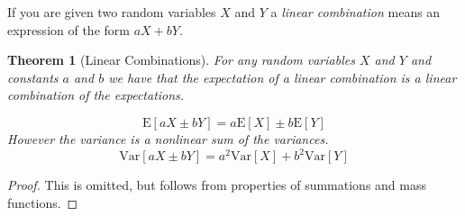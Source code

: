 \documentclass[
]{book}
\newtheorem{theorem}{Theorem}[chapter]
\theoremstyle{definition}
\theoremstyle{definition}
\theoremstyle{definition}
\theoremstyle{definition}
\theoremstyle{remark}
\begin{document}
If you are given two random variables \(X\) and \(Y\) a \emph{linear combination} means an expression of the form \(aX+bY\).

\begin{theorem}[Linear Combinations]
For any random variables \(X\) and \(Y\) and constants \(a\) and \(b\) we have that the expectation of a linear combination is a linear combination of the expectations.

\[\text{E}[aX\pm bY] = a\text{E}[X]\pm b\text{E}[Y]\]
However the variance is a nonlinear sum of the variances.\\
\[\text{Var}[aX\pm bY] = a^2\text{Var}[X]+b^2\text{Var}[Y] \]
\end{theorem}

\begin{proof}
This is omitted, but follows from properties of summations and mass functions.
\end{proof}
\end{document}
